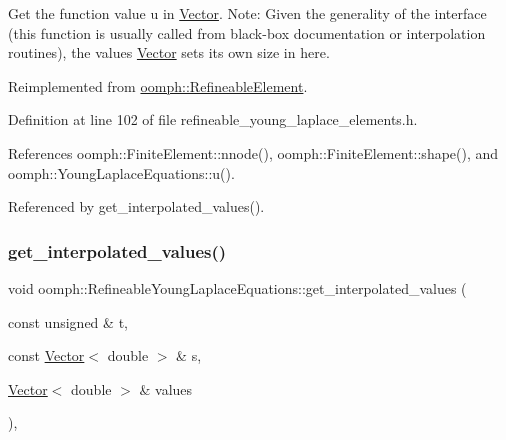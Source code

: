 Get the function value u in \hyperlink{classoomph_1_1Vector}{Vector}. Note\+: Given the generality of the interface (this function is usually called from black-\/box documentation or interpolation routines), the values \hyperlink{classoomph_1_1Vector}{Vector} sets its own size in here. 



Reimplemented from \hyperlink{classoomph_1_1RefineableElement_ad9a4f92880668a2373326d8306365c43}{oomph\+::\+Refineable\+Element}.



Definition at line 102 of file refineable\+\_\+young\+\_\+laplace\+\_\+elements.\+h.



References oomph\+::\+Finite\+Element\+::nnode(), oomph\+::\+Finite\+Element\+::shape(), and oomph\+::\+Young\+Laplace\+Equations\+::u().



Referenced by get\+\_\+interpolated\+\_\+values().

\mbox{\label{classoomph_1_1RefineableYoungLaplaceEquations_a0fad7813f5ad8046353921f263c1af05}} 
\subsubsection{\texorpdfstring{get\+\_\+interpolated\+\_\+values()}{get\_interpolated\_values()}\hspace{0.1cm}{\footnotesize\ttfamily [2/2]}}
{\footnotesize\ttfamily void oomph\+::\+Refineable\+Young\+Laplace\+Equations\+::get\+\_\+interpolated\+\_\+values (\begin{DoxyParamCaption}\item[{const unsigned \&}]{t,  }\item[{const \hyperlink{classoomph_1_1Vector}{Vector}$<$ double $>$ \&}]{s,  }\item[{\hyperlink{classoomph_1_1Vector}{Vector}$<$ double $>$ \&}]{values }\end{DoxyParamCaption})\hspace{0.3cm}{\ttfamily [inline]}, {\ttfamily [virtual]}}



